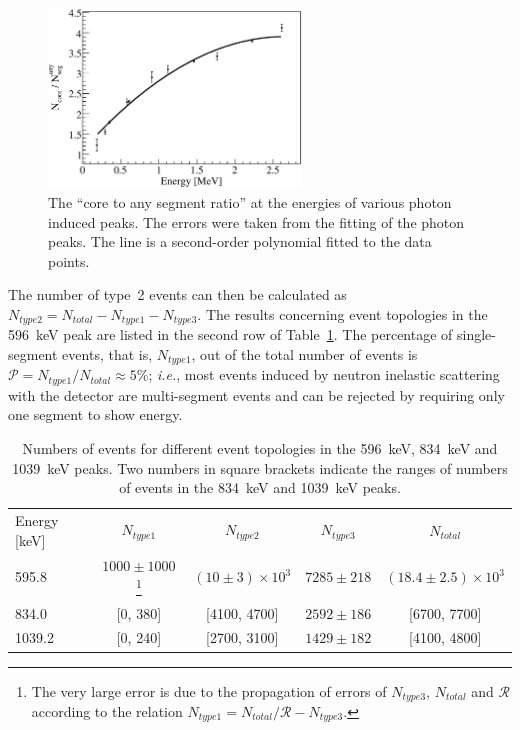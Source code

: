 \begin{figure}[tbhp]
\centering
\includegraphics[width=0.6\textwidth,clip]{sf}
\caption{The ``core to any segment ratio'' at the energies of various
photon induced peaks. The errors were taken from the fitting of the
photon peaks. The line is a second-order polynomial fitted to the data
points.}
\label{fig:neu:sf}
\end{figure}

The number of type~2 events can then be calculated as $N_{type2} =
N_{total} - N_{type1} - N_{type3}$. The results concerning event
topologies in the 596~keV peak are listed in the second row of
Table~\ref{tab:neu:ncore}. The percentage of single-segment events,
that is, $N_{type1}$, out of the total number of events is
$\mathcal{P} = N_{type1} / N_{total} \approx 5\%$; \textit{i.e.}, most
events induced by neutron inelastic scattering with the detector are
multi-segment events and can be rejected by requiring only one segment
to show energy.

\begin{table}[tbhp]
\centering
\caption{Numbers of events for different event topologies in the 
596~keV, 834~keV and 1039~keV peaks. Two numbers in square brackets 
indicate the ranges of numbers of events in the 834~keV and 1039~keV 
peaks.}
\label{tab:neu:ncore}
\begin{minipage}{\textwidth}\centering
\begin{tabular*}{\textwidth}{lcccc} \hline\noalign{\smallskip} Energy
[keV] & $N_{type 1}$ & $N_{type 2}$ & $N_{type 3}$ & $N_{total}$ \\
\noalign{\smallskip}\hline\noalign{\smallskip}
595.8 & $1000 \pm 1000$ \footnote{The very large error is due to the propagation of errors of $N_{type3}$, $N_{total}$ and $\mathcal{R}$ according to the relation $N_{type1} = N_{total} / \mathcal{R} - N_{type3}$.} & $(10 \pm 3)\times10^3$ & $7285 \pm 218$ & $(18.4 \pm 2.5)\times10^3$ \\
834.0  & [0, 380] & [4100, 4700] & $2592 \pm 186$ & [6700, 7700] \\
1039.2 & [0, 240] & [2700, 3100] & $1429 \pm 182$ & [4100, 4800] \\
\end{tabular*}
\end{minipage}
\end{table}

